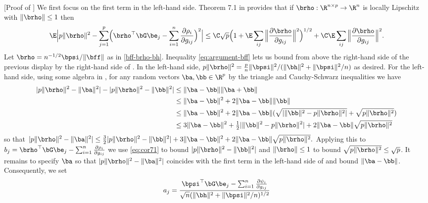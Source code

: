 \documentclass{colt2022} %
\renewenvironment{proof}[1][]
{
    \begin{newproof}
    \ifthenelse{\equal{#1}{}}{ }{\textbf{(#1) }}%
}{
    \end{newproof}
}
\numberwithin{equation}{section}
\begin{document}
\thmChi*

\begin{proof} [Proof of ]
    We first focus on the first term in the left-hand side.
    Theorem 7.1 in \cite{bellec2020out_of_sample}
    provides that if $\brho:\R^{n\times p}\to\R^n$ is locally Lipschitz
    with $\|\brho\|\le 1$ then
    \begin{equation}
        \E\Big| p \|\brho\|^2 - \sum_{j=1}^p
        \Bigl(\brho^\top\bG\be_j -\sum_{i=1}^n \frac{\partial \rho_i }{\partial g_{ij}}\Bigr)^2\Big|
        \le \C \sqrt p \Bigl( 1+ \E\sum_{ij} \Big\|\frac{\partial \brho}{\partial g_{ij}}\Big\|^2\Bigr)^{1/2}
        +\C \E\sum_{ij} \Big\|\frac{\partial \brho}{\partial g_{ij}}\Big\|^2.
        \label{eq:cor71}
    \end{equation}
    Let $\brho = n^{-1/2}\bpsi / \|\bff\|$ as in \eqref{bff-brho-bh}.
    Inequality \eqref{eq:argument-bff}
    lets us bound from above the right-hand side of the previous display
    by the right-hand side of
    .
    In the left-hand side, $p\|\brho\|^2 = \frac pn \|\bpsi\|^2 / (\|\bh\|^2 + \|\bpsi\|^2/n)$ as desired.
    For the left-hand side, using some algebra
    in \cite[Section 7]{bellec2020out_of_sample},
    for any random vectors $\ba,\bb\in\R^p$
    by the triangle and Cauchy-Schwarz inequalities we have
    \begin{align*}
    |p\|\brho\|^2 - \|\ba\|^2|
    -|p\|\brho\|^2 - \|\bb\|^2|
    &\le 
    \|\ba-\bb\| \|\ba + \bb\|
  \\&\le \|\ba-\bb\|^2 + 2\|\ba-\bb\|\|\bb\|
  \\&\le \|\ba-\bb\|^2 + 2\|\ba-\bb\|(\sqrt{|\|\bb\|^2-p\|\brho\|^2|}+\sqrt{p\|\brho\|^2})
  \\&\le 3\|\ba-\bb\|^2 + \tfrac 1 2|\|\bb\|^2 - p\|\brho\|^2|
  + 2 \|\ba-\bb\| \sqrt{p\|\brho\|^2}
    \end{align*}
    so that
    $|p\|\brho\|^2 - \|\ba\|^2|
    \le\frac32 |p\|\brho\|^2 - \|\bb\|^2|
    + 3 \|\ba-\bb\|^2
    + 2 \|\ba-\bb\| \sqrt{p\|\brho\|^2}.
    $
    Applying this to $b_j = \brho^\top\bG\be_j - \sum_{i=1}^n\frac{\partial \rho_i}{\partial g_{ij}}$
    we use \eqref{eq:cor71}
    to bound $|p\|\brho\|^2 - \|\bb\|^2|$
    and $\|\brho\|\le 1$ to bound
    $\sqrt{p\|\brho\|^2}\le \sqrt p$. It remains to specify
    $\ba$ so that $|p\|\brho\|^2 - \|\ba\|^2|$ coincides
    with the first term in the left-hand side of 
    and bound $\|\ba-\bb\|$. Consequently, we set
    $$a_j =\frac{  
    \bpsi^\top\bG\be_j - \sum_{i=1}^n\frac{\partial \psi_i}{\partial g_{ij}}}{\sqrt n (\|\bh\|^2 + \|\bpsi\|^2/n)^{1/2}}
$$
\end{proof}
\end{document}
